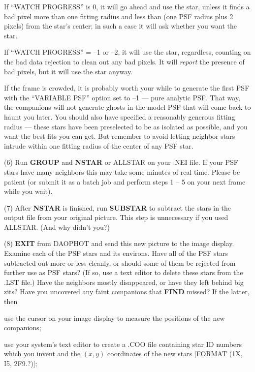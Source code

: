  If ``WATCH PROGRESS'' is 0, it will go ahead and use the
star, unless it finds a bad pixel more than one fitting radius and less
than (one PSF radius plus 2 pixels) from the star's center; in such a
case it will ask whether you want the star.

 If ``WATCH PROGRESS'' = --1 or --2, it will use the
star, regardless, counting on the bad data rejection to clean out any
bad pixels.  It will {\it report\/} the presence of bad pixels, but it
will use the star anyway.

\item{} If the frame is crowded, it is probably worth your while to
generate the first PSF with the ``VARIABLE PSF'' option set to --1 ---
pure analytic PSF.  That way, the companions will not generate ghosts
in the model PSF that will come back to haunt you later.  You should
also have specified a reasonably generous fitting radius --- these
stars have been preselected to be as isolated as possible, and you want
the best fits you can get.  But remember to avoid letting neighbor
stars intrude within one fitting radius of the center of any PSF star.

\item{(6)} Run {\bf GROUP} and {\bf NSTAR} or ALLSTAR on your
.NEI file.  If your PSF stars have many neighbors this may take some
minutes of real time.  Please be patient (or submit it as a batch
job and perform steps 1 -- 5 on your next frame while you wait).

\item{(7)} After {\bf NSTAR} is finished, run {\bf SUBSTAR} to
subtract the stars in the output file from your original picture.
This step is unnecessary if you used ALLSTAR. (And why didn't
you?)

\item{(8)} {\bf EXIT} from DAOPHOT and send this new picture to the
image display. Examine each of the PSF stars and its environs.  Have
all of the PSF stars subtracted out more or less cleanly, or should
some of them be rejected from further use as PSF stars?  (If so, use
a text editor to delete these stars from the .LST file.)  Have the
neighbors mostly disappeared, or have they left behind big zits?  Have
you uncovered any faint companions that {\bf FIND} missed?  If the
latter, then

 use the cursor on your image display to measure the
positions of the new companions;

 use your system's text editor to create a .COO file
containing star ID numbers which you invent and the $(x,y)$ coordinates
of the new stars [FORMAT (1X, I5, 2F9.?)];

